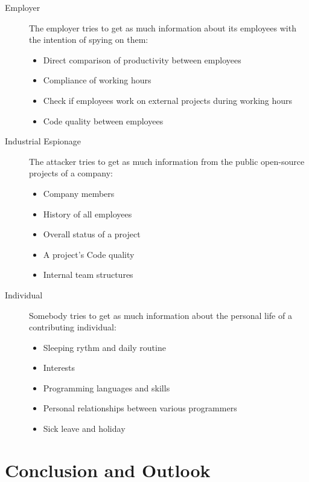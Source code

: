 \documentclass{thesis}
\begin{document}
\begin{description}
    \item[Employer]
        The employer tries to get as much information about its employees with the intention of spying on them:
        \begin{itemize}
            \item Direct comparison of productivity between employees
            \item Compliance of working hours
            \item Check if employees work on external projects during working hours
            \item Code quality between employees
        \end{itemize}

    \item[Industrial Espionage]
        The attacker tries to get as much information from the public open-source projects of a company:
        \begin{itemize}
            \item Company members
            \item History of all employees
            \item Overall status of a project
            \item A project's Code quality
            \item Internal team structures
        \end{itemize}

    \item[Individual]
        Somebody tries to get as much information about the personal life of a contributing individual:
        \begin{itemize}
            \item Sleeping rythm and daily routine
            \item Interests
            \item Programming languages and skills
            \item Personal relationships between various programmers
            \item Sick leave and holiday
        \end{itemize}

\end{description}


\chapter{Conclusion and Outlook}
\end{document}

